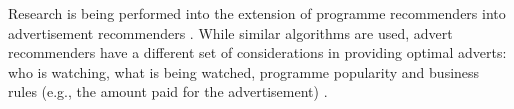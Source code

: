 	Research is being performed into the extension of programme recommenders into advertisement recommenders \citep{contextual_advertising}. While similar algorithms are used, advert recommenders have a different set of considerations in providing optimal adverts: who is watching, what is being watched, programme popularity and business rules (e.g., the amount paid for the advertisement) \citep{contextual_advertising}.


